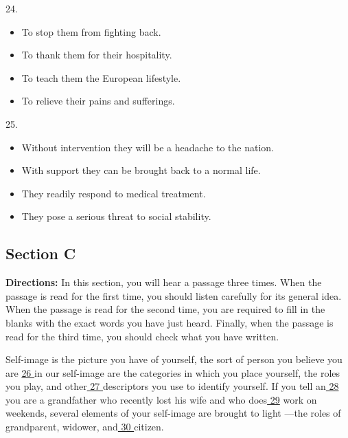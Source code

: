 \documentclass[UTF8,11pt]{ctexart}
\begin{document}
24.


\begin{itemize}[leftmargin=2em,itemsep=.2em,topsep=.4em]\item[A.] To stop them from fighting back.
\item[B.] To thank them for their hospitality.
\item[C.] To teach them the European lifestyle.
\item[D.] To relieve their pains and sufferings.
\end{itemize}

25.


\begin{itemize}[leftmargin=2em,itemsep=.2em,topsep=.4em]\item[A.] Without intervention they will be a headache to the nation.
\item[B.] With support they can be brought back to a normal life.
\item[C.] They readily respond to medical treatment.
\item[D.] They pose a serious threat to social stability.
\end{itemize}

\subsection*{\textbf{Section C}}


\textbf{Directions:} In this section, you will hear a passage three times. When the passage is read for the first time, you should listen carefully for its general idea. When the passage is read for the second time, you are required to fill in the blanks with the exact words you have just heard. Finally, when the passage is read for the third time, you should check what you have written.


Self-image is the picture you have of yourself, the sort of person you believe you are \uline{26 }in our self-image are the categories in which you place yourself, the roles you play, and other\uline{ 27 }descriptors you use to identify yourself. If you tell an\uline{ 28 }you are a grandfather who recently lost his wife and who does\uline{ 29} work on weekends, several elements of your self-image are brought to light —the roles of grandparent, widower, and\uline{ 30 }citizen.
\end{document}
